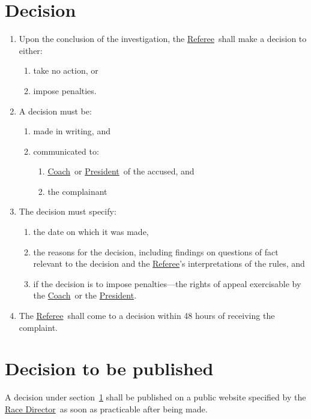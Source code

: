 \documentclass[12pt]{report}
\newcommand{\hyplink}[1]{\hyperlink{#1}{{#1}}}
\newcommand{\Captain}{\hyplink{Coach}}
\newcommand\President{\hyplink{President}}\newcommand\xPresident{President}
\newcommand{\RaceDirector}{\hyplink{Race Director}}
\newcommand{\Referee}{\hyplink{Referee}}
\begin{document}
  \section{Decision}\label{sec:RefereeDecision}
  \begin{enumerate}
    \item Upon the conclusion of the investigation, the \Referee\ shall make a decision to either:
    \begin{enumerate}
      \item take no action, or
      \item impose penalties.
    \end{enumerate}
    \item A decision must be:
    \begin{enumerate}
      \item made in writing, and
      \item communicated to:
      \begin{enumerate}
      \item \Captain\ or \President\ of the accused, and
      \item the complainant
      \end{enumerate}
    \end{enumerate}
    \item The decision must specify:
    \begin{enumerate}
      \item the date on which it was made,
      \item the reasons for the decision, including findings on questions of fact relevant to the decision and the \Referee's interpretations of the rules, and
      \item if the decision is to impose penalties---the rights of appeal exercisable by the \Captain\ or the \President.
    \end{enumerate}
    \item The \Referee\ shall come to a decision within 48 hours of receiving the complaint.
  \end{enumerate}
  \section{Decision to be published}\label{sec:DecisionPublish}
  \begin{fenumerate}
    \item A decision under section~\ref{sec:RefereeDecision} shall be published on a public website  specified by the \RaceDirector\ as soon as practicable after being made.
  \end{fenumerate}
\end{document}
